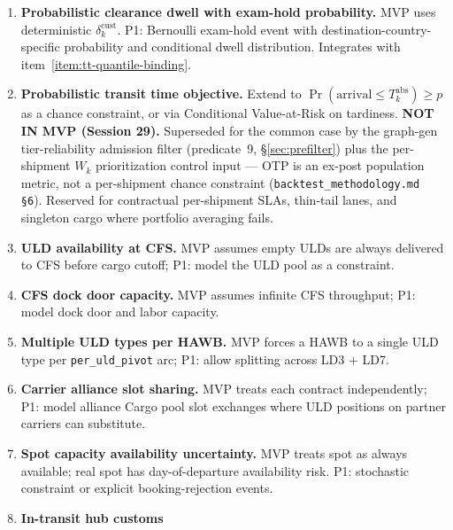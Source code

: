 \documentclass[11pt,a4paper]{article}
\theoremstyle{definition}
\begin{document}
\begin{enumerate}
        land in storage.
  \item \label{item:probabilistic-clearance} \textbf{Probabilistic clearance
        dwell with exam-hold probability.} MVP uses deterministic
        $\delta^{\text{cust}}_k$. P1: Bernoulli exam-hold event with
        destination-country-specific probability and conditional dwell
        distribution. Integrates with item~\ref{item:tt-quantile-binding}.
  \item \label{item:probabilistic-transit} \textbf{Probabilistic transit
        time objective.} Extend to $\Pr(\text{arrival} \leq T_k^{\text{abs}})
        \geq p$ as a chance constraint, or via Conditional Value-at-Risk on
        tardiness. \textbf{NOT IN MVP (Session 29).} Superseded for the common
        case by the graph-gen tier-reliability admission filter (predicate~9,
        \S\ref{sec:prefilter}) plus the per-shipment $W_k$ prioritization control
        input --- OTP is an ex-post population metric, not a per-shipment chance
        constraint (\texttt{backtest\_methodology.md \S6}). Reserved for
        contractual per-shipment SLAs, thin-tail lanes, and singleton cargo where
        portfolio averaging fails.
  \item \label{item:uld-availability} \textbf{ULD availability at CFS.} MVP
        assumes empty ULDs are always delivered to CFS before cargo cutoff;
        P1: model the ULD pool as a constraint.
  \item \label{item:cfs-dock-capacity} \textbf{CFS dock door capacity.} MVP
        assumes infinite CFS throughput; P1: model dock door and labor
        capacity.
  \item \label{item:multi-uld-types-per-shipment} \textbf{Multiple ULD
        types per HAWB.} MVP forces a HAWB to a single ULD type per
        \texttt{per\_uld\_pivot} arc; P1: allow splitting across LD3 + LD7.
  \item \label{item:alliance-slot-sharing} \textbf{Carrier alliance slot
        sharing.} MVP treats each contract independently; P1: model alliance
        Cargo pool slot exchanges where ULD positions on partner carriers can
        substitute.
  \item \label{item:spot-availability-uncertainty} \textbf{Spot capacity
        availability uncertainty.} MVP treats spot as always available; real
        spot has day-of-departure availability risk. P1: stochastic
        constraint or explicit booking-rejection events.
  \item \label{item:in-transit-hub-customs} \textbf{In-transit hub customs
}
\end{enumerate}
\end{document}
